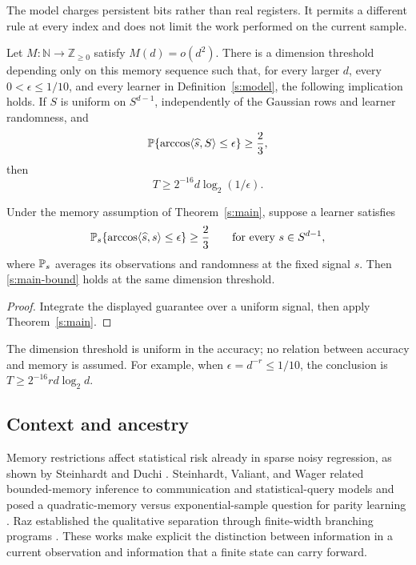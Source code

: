 The model charges persistent bits rather than real registers. It
permits a different rule at every index and does not limit the work
performed on the current sample.

\begin{theorem}\label{s:main}
Let \(M:\mathbb N\to\mathbb Z_{\ge0}\) satisfy \(M(d)=o(d^2)\).
There is a dimension threshold depending only on this memory sequence
such that, for every larger \(d\), every \(0<\epsilon\le1/10\), and
every learner in Definition~\ref{s:model}, the following implication
holds. If \(S\) is uniform on \(S^{d-1}\), independently of the
Gaussian rows and learner randomness, and
\[
 \mathbb P\{\arccos\langle \widehat s,S\rangle\le\epsilon\}\ge\frac23,
\]
then
\begin{equation}\label{s:main-bound}
 T\ge 2^{-16}d\log_2(1/\epsilon).
\end{equation}
\end{theorem}

\begin{corollary}\label{s:worst-signal}
Under the memory assumption of Theorem~\ref{s:main}, suppose a learner
satisfies
\[
 \mathbb P_s\{\arccos\langle \widehat s,s\rangle\le\epsilon\}\ge\frac23
 \qquad\text{for every }s\in S^{d-1},
\]
where \(\mathbb P_s\) averages its observations and randomness at the fixed
signal \(s\). Then \eqref{s:main-bound} holds at the same dimension
threshold.
\end{corollary}
\begin{proof}
Integrate the displayed guarantee over a uniform signal, then apply
Theorem~\ref{s:main}.
\end{proof}

The dimension threshold is uniform in the accuracy; no relation between
accuracy and memory is assumed. For example, when
\(\epsilon=d^{-r}\le1/10\), the conclusion is
\(T\ge2^{-16}r d\log_2 d\).

\subsection*{Context and ancestry}


Memory restrictions affect statistical risk already in sparse noisy
regression, as shown by Steinhardt and Duchi
\cite[Section~1.1, equation~(2)]{SteinhardtDuchi2015}.
Steinhardt, Valiant, and Wager related bounded-memory inference to
communication and statistical-query models and posed a quadratic-memory
versus exponential-sample question for parity learning
\cite[Section~1.1, Conjecture~1]{SVW2016}. Raz established the
qualitative separation through finite-width branching programs
\cite[Theorem~1]{Raz2016}. These works make explicit the distinction
between information in a current observation and information that a
finite state can carry forward.

